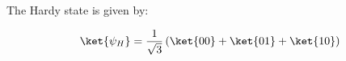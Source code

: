 \documentclass{article}
\begin{document}
The Hardy state is given by:

\[
\ket{\psi_H} = \frac{1}{\sqrt{3}} \left( \ket{00} + \ket{01} + \ket{10} \right)
\]
\end{document}
